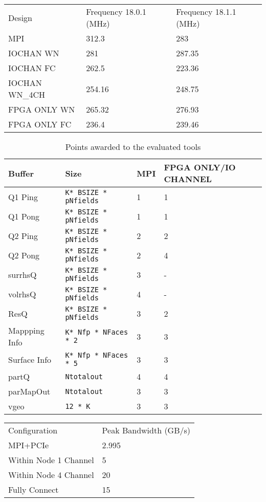 \begin{table}[]
\begin{tabular}{lll}
Design         & Frequency 18.0.1 (MHz) & Frequency 18.1.1 (MHz) \\
MPI            & 312.3                  & 283                    \\
IOCHAN WN      & 281                    & 287.35                 \\
IOCHAN FC      & 262.5                  & 223.36                 \\
IOCHAN WN\_4CH & 254.16                 & 248.75                 \\
FPGA ONLY WN   & 265.32                 & 276.93                 \\
FPGA ONLY FC   & 236.4                  & 239.46
\end{tabular}
\end{table}

\begin{table}[h]
    \begin{center}
        \caption{Points awarded to the evaluated tools}
        \label{tab:channel_assign}
        \begin{tabular}{|l|l|C{3cm}|C{3.4cm}|} %
          \hline
          \textbf{Buffer} & \textbf{Size} & \textbf{MPI} & \textbf{FPGA ONLY/IO CHANNEL}\\
          \hline
          Q1 Ping & \texttt{K* BSIZE * pNfields}  & 1 & 1 \\
          \hline
          Q1 Pong & \texttt{K* BSIZE * pNfields} & 1 & 1 \\
          Q2 Ping & \texttt{K* BSIZE * pNfields}  & 2 & 2 \\
          \hline
          Q2 Pong & \texttt{K* BSIZE * pNfields}  & 2 & 4 \\
          \hline
          surrhsQ & \texttt{K* BSIZE * pNfields}  & 3 & - \\
          \hline
          volrhsQ & \texttt{K* BSIZE * pNfields}  & 4 & - \\
          \hline
          ResQ & \texttt{K* BSIZE * pNfields}  & 3 & 2 \\
          \hline
          Mappping Info & \texttt{K* Nfp * NFaces * 2}  & 3 & 3 \\
          \hline
          Surface Info & \texttt{K* Nfp * NFaces * 5} & 3 & 3 \\
          \hline
          partQ & \texttt{Ntotalout} & 4 & 4 \\
          \hline
          parMapOut & \texttt{Ntotalout}  & 3 & 3 \\
          \hline
          vgeo & \texttt{12 * K}  & 3 & 3 \\
          \hline

        \end{tabular}
    \end{center}
 \end{table}


 \begin{table}[]
  \begin{tabular}{ll}
  Configuration         & Peak Bandwidth (GB/s) \\
  MPI+PCIe              & 2.995                 \\
  Within Node 1 Channel & 5                     \\
  Within Node 4 Channel & 20                    \\
  Fully Connect         & 15
  \end{tabular}
\end{table}